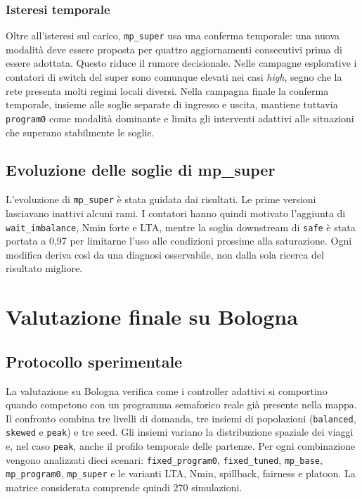 \documentclass[12pt,a4paper,oneside]{report}
\numberwithin{equation}{chapter}
\begin{document}
\subsection{Isteresi temporale}

Oltre all'isteresi sul carico, \texttt{mp\_super} usa una conferma temporale:
una nuova modalità deve essere proposta per quattro aggiornamenti consecutivi prima di
essere adottata. Questo riduce il rumore decisionale. Nelle campagne
esplorative i contatori di switch del super sono comunque elevati nei casi \emph{high},
segno che la rete presenta molti regimi locali diversi. Nella campagna finale
la conferma temporale, insieme alle soglie separate di ingresso e uscita,
mantiene tuttavia \texttt{program0} come modalità dominante e limita gli
interventi adattivi alle situazioni che superano stabilmente le soglie.

\enlargethispage{2\baselineskip}
\section{Evoluzione delle soglie di mp\_super}

L'evoluzione di \texttt{mp\_super} è stata guidata dai risultati. Le prime
versioni lasciavano inattivi alcuni rami. I contatori hanno quindi motivato
l'aggiunta di \texttt{wait\_imbalance}, Nmin forte e LTA, mentre la soglia
downstream di \texttt{safe} è stata portata a 0,97 per limitarne l'uso alle
condizioni prossime alla saturazione. Ogni modifica deriva così da una diagnosi
osservabile, non dalla sola ricerca del risultato migliore.



\chapter{Valutazione finale su Bologna}
\label{chap:bologna-risultati}

\section{Protocollo sperimentale}

La valutazione su Bologna verifica come i controller adattivi si comportino
quando competono con un programma semaforico reale già presente nella mappa.
Il confronto combina tre livelli di domanda, tre insiemi di popolazioni
(\texttt{balanced}, \texttt{skewed} e \texttt{peak}) e tre seed. Gli insiemi
variano la distribuzione spaziale dei viaggi e, nel caso \texttt{peak}, anche
il profilo temporale delle partenze. Per ogni combinazione vengono analizzati
dieci scenari: \texttt{fixed\_program0}, \texttt{fixed\_tuned},
\texttt{mp\_base}, \texttt{mp\_program0}, \texttt{mp\_super} e le varianti LTA,
Nmin, spillback, fairness e platoon. La matrice considerata comprende quindi
270 simulazioni.
\end{document}
